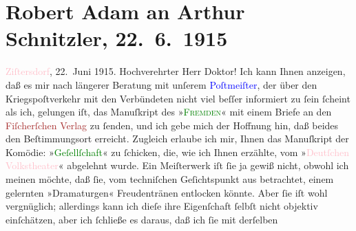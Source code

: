 

               \section[Robert Adam an Arthur Schnitzler, 22. 6. 1915]{ Robert Adam an Arthur Schnitzler, 22. 6. 1915}\nopagebreak{}\rehead{ }\normalsize\beginnumbering{} \toendnotes[C]{\smallbreak\pagebreak[2]} 
\toendnotes[C]{\smallbreak}\pstart
           \raggedleft{}{\pb}\textcolor{pink}{Ziſtersdorf}{}\ledrightnote{\textcolor{pink}{Zistersdorf}}, 22. Juni 1915. \pend
           \pstart{}Hochverehrter Herr Doktor!\pend\pstart
           Ich kann Ihnen anzeigen, daß es mir nach längerer Beratung mit unſerem \textcolor{blue}{Poſtmeiſter}{}, der über den
                    Kriegspoſtverkehr mit den Verbündeten nicht viel beſſer informiert zu ſein
                    ſcheint als ich, gelungen iſt, das Manuſkript des »\textcolor{green}{\textsc{Fremden}}{}\ledrightnote{\textcolor{green}{Der Fremde}}« mit einem Briefe an den \textcolor{brown}{Fiſcherſchen
                        Verlag}{}\ledrightnote{\textcolor{brown}{S. Fischer Verlag}} zu ſenden, und ich gebe mich der Hoffnung hin, daß beides den
                    Beſtimmungsort erreicht.\pend
           \pstart
           Zugleich erlaube ich mir, Ihnen das Manuſkript der Komödie: »\textcolor{green}{Geſellſchaft}{}\ledrightnote{\textcolor{green}{Gesellschaft [Eine Gaunerkomödie]}}« zu ſchicken, die, wie ich Ihnen erzählte, vom
                        »\textcolor{pink}{Deutſchen Volkstheater}{}\ledrightnote{\textcolor{pink}{Volkstheater}}« abgelehnt wurde.
                    Ein Meiſterwerk iſt ſie ja gewiß nicht, obwohl ich meinen möchte, daß ſie, vom
                    techniſchen Geſichtspunkt aus betrachtet, einem gelernten »Dramaturgen«
                    Freudentränen entlocken könnte. Aber ſie iſt {\pb}wohl
                    vergnüglich; allerdings kann ich dieſe ihre Eigenſchaft ſelbſt nicht objektiv
                    einſchätzen, aber ich ſchließe es daraus, daß ich ſie mit derſelben

